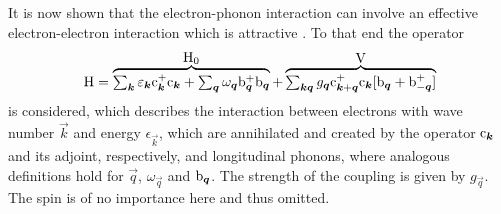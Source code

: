 It is now shown that the electron-phonon interaction can involve an effective
electron-electron interaction which is attractive \cite{Froehlich52}. To that
end the  operator
%
\begin{gather*}
    \op H = \hyper{
        \sum_{\vec k} \epsilon_{\vec k} \op c_{\vec k}^+ \op c_{\vec k} +
        \sum_{\vec q} \omega_{\vec q} \op b_{\vec q}^+ \op b_{\vec q}
    }{\op H_0} + \hyper{
        \sum_{\vec k \vec q} g_{\vec q} \op c_{\vec k + \vec q}^+ \op c_{\vec k}
        [\op b_{\vec q} + \op b_{-\vec q}^+]
    }{\op V}
\end{gather*}
%
is considered, which describes the interaction between electrons with wave
number $\vec k$ and energy $\epsilon_{\vec k}$, which are annihilated and
created by the  operator $\mathrm c_{\boldsymbol k}$ and its adjoint,
respectively, and longitudinal phonons, where analogous definitions hold for
$\vec q$, $\omega_{\vec q}$ and $\mathrm b_{\boldsymbol q}$. The strength of the coupling
is given by $g_{\vec q}$. The spin is of no importance here and thus omitted.

